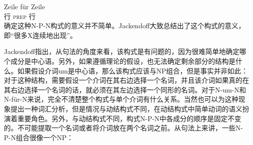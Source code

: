 \begin{exe}
\begin{xlist}[iv.]
\begin{exe}
\begin{xlist}[iv.]
\ex 
\gll Zeile für Zeile\footnotemark\\
	 行 \textsc{prep} 行\\
\zl
确定这种N-P-N构式的意义并不简单。Jackendoff大致总结出了这个构式的意义，即“很多X连续地出现”。

Jackendoff指出，从句法的角度来看，该构式是有问题的，因为很难简单地确定哪个成分是中心语。另外，如果遵循\xbarc 理论的假设，也无法确定剩余部分的结构是什么。如果假设介词um是中心语，那么该构式应该与NP组合，但是事实并非如此：
\eal
{} 
\zl
对于这种结构，需要假设一个介词在其右边选择一个名词，并且该介词如果真的在其右边选择一个名词的话，就必须在其左边选择一个同形的名词。对于N-um-N和N-für-N来说，完全不清楚整个构式与单个介词有什么关系。当然也可以为这种现象提出一种词汇分析，但是情况与动结构式不同，在动结构式中简单动词的语义扮演着重要角色。另外，与动结构式不同，构式N-P-N中各成分的顺序是固定不变的。不可能提取一个名词或者将介词放在两个名词之前。从句法上来讲，一些N-P-N组合很像一个NP\citep[]{Jackendoff2008a}：

\end{xlist}
\end{exe}
\end{xlist}
\end{exe}
